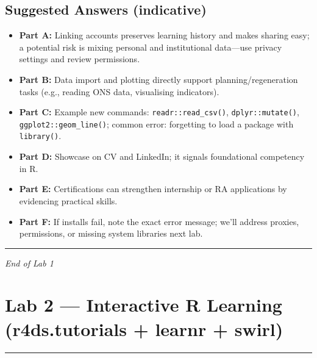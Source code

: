 \documentclass[
  letterpaper,
  DIV=11,
  numbers=noendperiod]{scrreprt}
\providecommand{\tightlist}{%
  \setlength{\itemsep}{0pt}\setlength{\parskip}{0pt}}
\begin{document}
\section{Suggested Answers
(indicative)}\label{suggested-answers-indicative}

\begin{itemize}
\tightlist
\item
  \textbf{Part A:} Linking accounts preserves learning history and makes
  sharing easy; a potential risk is mixing personal and institutional
  data---use privacy settings and review permissions.\\
\item
  \textbf{Part B:} Data import and plotting directly support
  planning/regeneration tasks (e.g., reading ONS data, visualising
  indicators).\\
\item
  \textbf{Part C:} Example new commands: \texttt{readr::read\_csv()},
  \texttt{dplyr::mutate()}, \texttt{ggplot2::geom\_line()}; common
  error: forgetting to load a package with \texttt{library()}.\\
\item
  \textbf{Part D:} Showcase on CV and LinkedIn; it signals foundational
  competency in R.\\
\item
  \textbf{Part E:} Certifications can strengthen internship or RA
  applications by evidencing practical skills.\\
\item
  \textbf{Part F:} If installs fail, note the exact error message; we'll
  address proxies, permissions, or missing system libraries next lab.
\end{itemize}

\begin{center}\rule{0.5\linewidth}{0.5pt}\end{center}

\emph{End of Lab 1}


\chapter{Lab 2 --- Interactive R Learning (r4ds.tutorials + learnr +
swirl)}\label{lab-2-interactive-r-learning-r4ds.tutorials-learnr-swirl}

\begin{center}\rule{0.5\linewidth}{0.5pt}\end{center}
\end{document}
